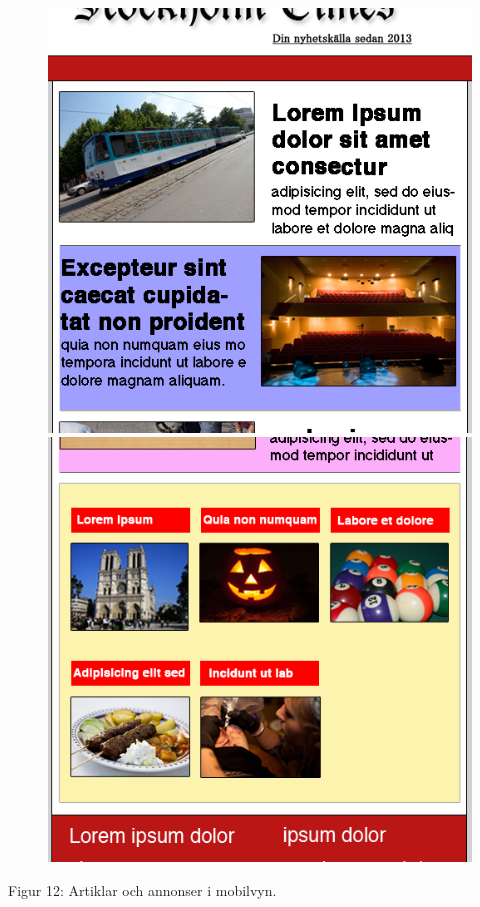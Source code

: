 \documentclass[11pt]{article}
\begin{document}
\begin{figure}[H]
\centerline{%
\includegraphics[scale=0.35]{pics/artikelmobil.png}\hspace{2em}%
\includegraphics[scale=0.35]{pics/annonsmobil.png}%
}
\end{figure}
\hspace{0.5cm}Figur 12: Artiklar och annonser i mobilvyn.
\end{document}
